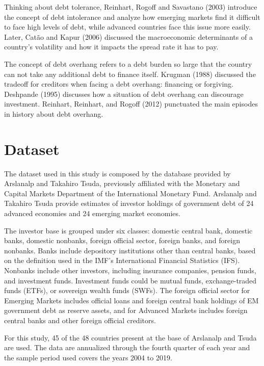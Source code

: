 \documentclass[
]{article}
\begin{document}
Thinking about debt tolerance, Reinhart, Rogoff and Savastano (2003)
introduce the concept of debt intolerance and analyze how emerging
markets find it difficult to face high levels of debt, while advanced
countries face this issue more easily. Later, Catão and Kapur (2006)
discussed the macroeconomic determinants of a country's volatility and
how it impacts the spread rate it has to pay.

The concept of debt overhang refers to a debt burden so large that the
country can not take any additional debt to finance itself. Krugman
(1988) discussed the tradeoff for creditors when facing a debt overhang:
financing or forgiving. Deshpande (1995) discusses how a situation of
debt overhang can discourage investment. Reinhart, Reinhart, and Rogoff
(2012) punctuated the main episodes in history about debt overhang.

\hypertarget{dataset}{%
\section{Dataset}\label{dataset}}

The dataset used in this study is composed by the database provided by
Arslanalp and Takahiro Tsuda, previously affiliated with the Monetary
and Capital Markets Department of the International Monetary Fund.
Arslanalp and Takahiro Tsuda provide estimates of investor holdings of
government debt of 24 advanced economies and 24 emerging market
economies.

The investor base is grouped under six classes: domestic central bank,
domestic banks, domestic nonbanks, foreign official sector, foreign
banks, and foreign nonbanks. Banks include depository institutions other
than central banks, based on the definition used in the IMF's
International Financial Statistics (IFS). Nonbanks include other
investors, including insurance companies, pension funds, and investment
funds. Investment funds could be mutual funds, exchange-traded funds
(ETFs), or sovereign wealth funds (SWFs). The foreign official sector
for Emerging Markets includes official loans and foreign central bank
holdings of EM government debt as reserve assets, and for Advanced
Markets includes foreign central banks and other foreign official
creditors.

For this study, 45 of the 48 countries present at the base of Arslanalp
and Tsuda are used. The data are annualized through the fourth quarter
of each year and the sample period used covers the years 2004 to 2019.
\end{document}
